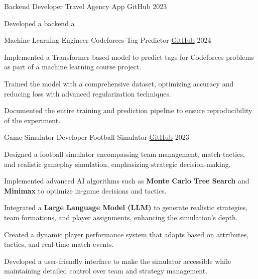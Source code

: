 \begin{cventries}
    \cventry
    {Backend Developer}
    {Travel Agency App}
    {GitHub}
    {2023}
    {
      \begin{cvitems}
        \item {Developed a backend a
        \begin{cventries}
            \cventry
            {Machine Learning Engineer}
            {Codeforces Tag Predictor}
            {\href{https://github.com/alexsierra45/codeforce-tag-predictor}{GitHub}}
            {2024}
            {
              \begin{cvitems}
                \item {Implemented a Transformer-based model to predict tags for Codeforces problems as part of a machine learning course project.}
                \item {Trained the model with a comprehensive dataset, optimizing accuracy and reducing loss with advanced regularization techniques.}
                \item {Documented the entire training and prediction pipeline to ensure reproducibility of the experiment.}
              \end{cvitems}
            }
            \cventry
            {Game Simulator Developer}
            {Football Simulator}
            {\href{https://github.com/alexsierra45/football-simulator}{GitHub}}
            {2023}
            {
              \begin{cvitems}
                \item {Designed a football simulator encompassing team management, match tactics, and realistic gameplay simulation, emphasizing strategic decision-making.}
                \item {Implemented advanced AI algorithms such as \textbf{Monte Carlo Tree Search} and \textbf{Minimax} to optimize in-game decisions and tactics.}
                \item {Integrated a \textbf{Large Language Model (LLM)} to generate realistic strategies, team formations, and player assignments, enhancing the simulation’s depth.}
                \item {Created a dynamic player performance system that adapts based on attributes, tactics, and real-time match events.}
                \item {Developed a user-friendly interface to make the simulator accessible while maintaining detailed control over team and strategy management.}
              \end{cvitems}
            }

\end{cventries}}
\end{cvitems}}
\end{cventries}
